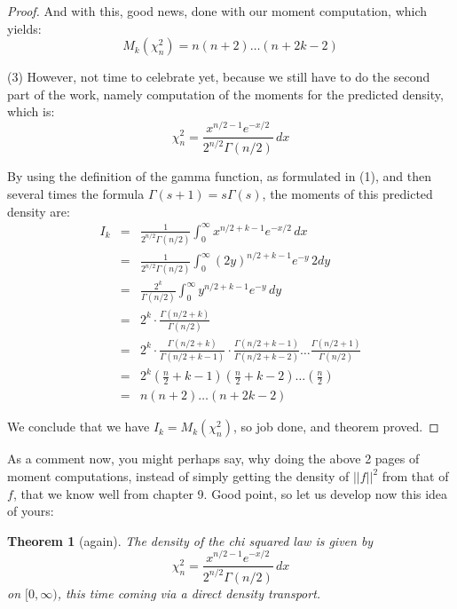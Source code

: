 \documentclass[12pt]{amsbook}
\newtheorem{theorem}{Theorem}[chapter]
\begin{document}
\begin{proof}
And with this, good news, done with our moment computation, which yields:
$$M_k(\chi_n^2)=n(n+2)\ldots(n+2k-2)$$

(3) However, not time to celebrate yet, because we still have to do the second part of the work, namely computation of the moments for the predicted density, which is:
$$\chi_n^2=\frac{x^{n/2-1}e^{-x/2}}{2^{n/2}\Gamma(n/2)}\,dx$$

By using the definition of the gamma function, as formulated in (1), and then several times the formula $\Gamma(s+1)=s\Gamma(s)$, the moments of this predicted density are:
\begin{eqnarray*}
I_k
&=&\frac{1}{2^{n/2}\Gamma(n/2)}\int_0^\infty x^{n/2+k-1}e^{-x/2}\,dx\\
&=&\frac{1}{2^{n/2}\Gamma(n/2)}\int_0^\infty (2y)^{n/2+k-1}e^{-y}\,2dy\\
&=&\frac{2^k}{\Gamma(n/2)}\int_0^\infty y^{n/2+k-1}e^{-y}\,dy\\
&=&2^k\cdot\frac{\Gamma(n/2+k)}{\Gamma(n/2)}\\
&=&2^k\cdot\frac{\Gamma(n/2+k)}{\Gamma(n/2+k-1)}\cdot\frac{\Gamma(n/2+k-1)}{\Gamma(n/2+k-2)}\ldots\frac{\Gamma(n/2+1)}{\Gamma(n/2)}\\
&=&2^k\left(\frac{n}{2}+k-1\right)\left(\frac{n}{2}+k-2\right)\ldots\left(\frac{n}{2}\right)\\
&=&n(n+2)\ldots(n+2k-2)
\end{eqnarray*}

We conclude that we have $I_k=M_k(\chi_n^2)$, so job done, and theorem proved.
\end{proof}

As a comment now, you might perhaps say, why doing the above 2 pages of moment computations, instead of simply getting the density of $||f||^2$ from that of $f$, that we know well from chapter 9. Good point, so let us develop now this idea of yours:

\begin{theorem}[again]
The density of the chi squared law is given by
$$\chi_n^2=\frac{x^{n/2-1}e^{-x/2}}{2^{n/2}\Gamma(n/2)}\,dx$$
on $[0,\infty)$, this time coming via a direct density transport.
\end{theorem}
\end{document}
